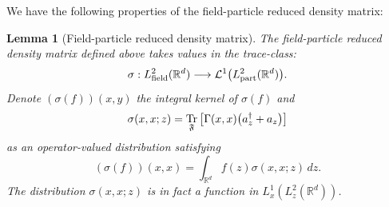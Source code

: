 \documentclass[10pt]{amsart}
\newtheorem{lemm}[theo]{Lemma}\newtheorem{prop}[theo]{Proposition}\newtheorem{coro}[theo]{Corollary}\newtheorem{conj}[theo]{Conjecture}
\theoremstyle{definition}\newtheorem{defi}[theo]{Definition}\newtheorem{rema}[theo]{Remark}\newtheorem{exam}[theo]{Example}\newtheorem{exem}[theo]{Example}\newtheorem{nota}[theo]{Notation}
\DeclareMathOperator{\Tr}{Tr}
\DeclareMathOperator{\partt}{part}
\DeclareMathOperator{\field}{field}
\newcommand{\cL}{\mathcal{L}}
\newcommand{\R}{\mathbb{R}}
\newcommand{\gF}{\mathfrak{F}}
\newcommand{\1}{\mathds{1}}
\renewcommand*{\to}{\mathchoice{\longrightarrow}{\rightarrow}{\rightarrow}{\rightarrow}}
\let\originalleft\left
\let\originalright\right
\renewcommand{\left}{\mathopen{}\mathclose\bgroup\originalleft}
\renewcommand{\right}{\aftergroup\egroup\originalright}
\begin{document}
We have the following properties of the field-particle reduced density matrix:

\begin{lemm}[{Field-particle reduced density matrix}]\label{lem:redmat}
The field-particle reduced density matrix defined above takes values in the trace-class:
\begin{equation*}
\sigma: L^2_{\field}(\R^d)\to \cL^1 \left(L^2_{\partt}(\R^d)\right).
\end{equation*}
Denote $(\sigma(f))(x,y)$ the integral kernel of $\sigma(f)$ and
\begin{equation*}
\sigma(x,x;z)=\Tr_{\gF}\big[\Gamma(x,x) \left(a^\dagger_z + a_z \right)\big]
\end{equation*}
as an operator-valued distribution satisfying
\begin{equation*}
(\sigma(f))(x,x)=\int_{\R^d}{{f(z)}} \sigma(x,x;z)\,dz.
\end{equation*}
The distribution $\sigma(x,x;z)$ is in fact a function in $L^1_x(L^2_z(\R^d))$.
\end{lemm}
\end{document}
